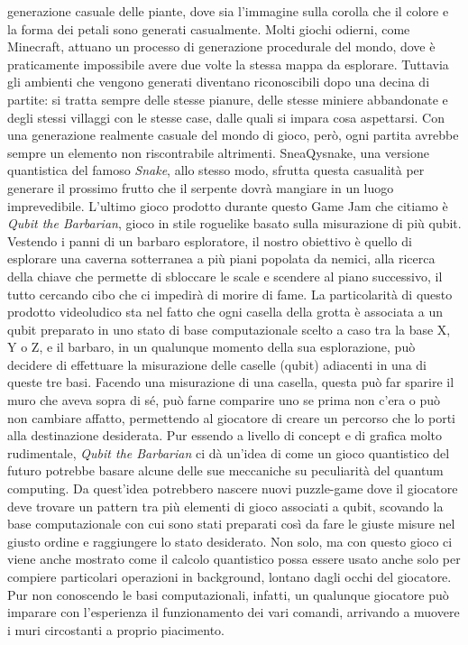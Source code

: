 \documentclass{book}
\theoremstyle{definition}
\theoremstyle{definition}
\theoremstyle{definition}
\theoremstyle{plain}
\theoremstyle{plain}
\theoremstyle{plain}
\theoremstyle{plain}
\begin{document}
generazione casuale delle piante, dove sia l'immagine sulla corolla che il colore e la forma dei petali sono generati casualmente. Molti giochi odierni, come Minecraft\cite{wiki:Minecraft}, attuano un processo di generazione procedurale del mondo, dove è praticamente impossibile avere due volte la stessa mappa da esplorare. Tuttavia gli ambienti che vengono generati diventano riconoscibili dopo una decina di partite: si tratta sempre delle stesse pianure, delle stesse miniere abbandonate e degli stessi villaggi con le stesse case, dalle quali si impara cosa aspettarsi. Con una generazione realmente casuale del mondo di gioco, però, ogni partita avrebbe sempre un elemento non riscontrabile altrimenti. SneaQysnake, una versione quantistica del famoso \emph{Snake}, allo stesso modo, sfrutta questa casualità per generare il prossimo frutto che il serpente dovrà mangiare in un luogo imprevedibile.
L'ultimo gioco prodotto durante questo Game Jam che citiamo è \emph{Qubit the Barbarian}, gioco in stile roguelike\cite{wiki:Roguelike} basato sulla misurazione di più qubit. Vestendo i panni di un barbaro esploratore, il nostro obiettivo è quello di esplorare una caverna sotterranea a più piani popolata da nemici, alla ricerca della chiave che permette di sbloccare le scale e scendere al piano successivo, il tutto cercando cibo che ci impedirà di morire di fame. La particolarità di questo prodotto videoludico sta nel fatto che ogni casella della grotta è associata a un qubit preparato in uno stato di base computazionale scelto a caso tra la base X, Y o Z, e il barbaro, in un qualunque momento della sua esplorazione, può decidere di effettuare la misurazione delle caselle (qubit) adiacenti in una di queste tre basi. Facendo una misurazione di una casella, questa può far sparire il muro che aveva sopra di sé, può farne comparire uno se prima non c'era o può non cambiare affatto, permettendo al giocatore di creare un percorso che lo porti alla destinazione desiderata. Pur essendo a livello di concept e di grafica molto rudimentale, \emph{Qubit the Barbarian} ci dà un'idea di come un gioco quantistico del futuro potrebbe basare alcune delle sue meccaniche su peculiarità del quantum computing. Da quest'idea potrebbero nascere nuovi puzzle-game dove il giocatore deve trovare un pattern tra più elementi di gioco associati a qubit, scovando la base computazionale con cui sono stati preparati così da fare le giuste misure nel giusto ordine e raggiungere lo stato desiderato. Non solo, ma con questo gioco ci viene anche mostrato come il calcolo quantistico possa essere usato anche solo per compiere particolari operazioni in background, lontano dagli occhi del giocatore. Pur non conoscendo le basi computazionali, infatti, un qualunque giocatore può imparare con l'esperienza il funzionamento dei vari comandi, arrivando a muovere i muri circostanti a proprio piacimento.
\end{document}
